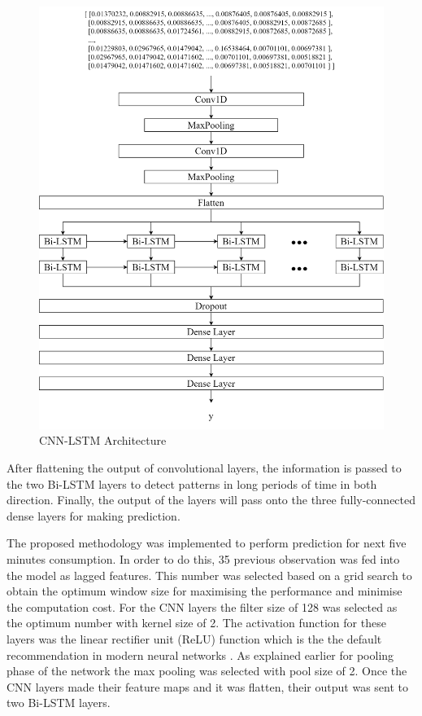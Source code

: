 \documentclass[twocolumn, a4paper,10pt]{article}
\begin{document}
\begin{figure}[ht]
    \centering
    \includegraphics[scale=0.12]{img/architecture.png}
    \caption{CNN-LSTM Architecture}
    \label{fig:CNN-LSTM}
\end{figure}

After flattening the output of convolutional layers, the information is passed to the two Bi-LSTM layers to detect patterns in long periods of time in both direction. Finally, the output of the layers will pass onto the three fully-connected dense layers for making prediction.

The proposed methodology was implemented to perform prediction for next five minutes consumption. In order to do this, 35 previous observation was fed into the model as lagged features. This number was selected based on a grid search to obtain the optimum window size for maximising the performance and minimise the computation cost. For the CNN layers the filter size of 128 was selected as the optimum number with kernel size of 2. The activation function for these layers was the linear rectifier unit (ReLU) function which is the the default recommendation in modern neural networks \citep{RN1282}. As explained earlier for pooling phase of the network the max pooling was selected with pool size of 2. Once the CNN layers made their feature maps and it was flatten, their output was sent to two Bi-LSTM layers.
\end{document}
